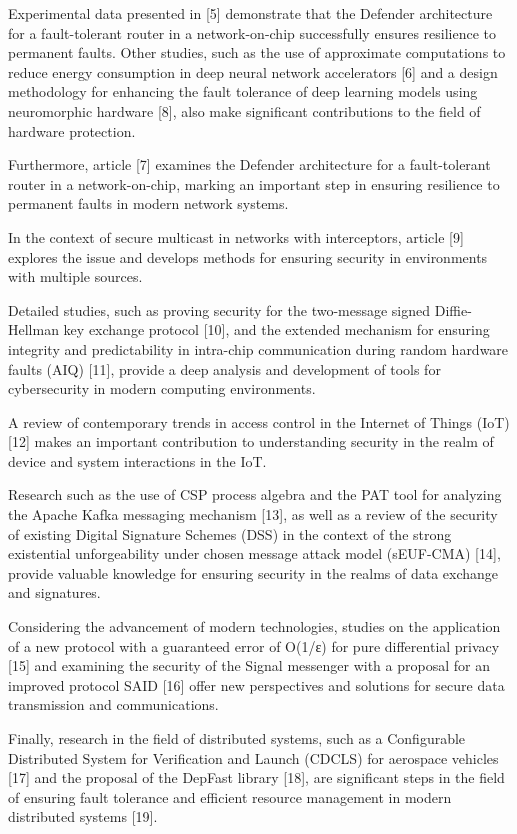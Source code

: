 \begin{multicols}{2}
Experimental data presented in {[}5{]} demonstrate that the Defender
architecture for a fault-tolerant router in a network-on-chip
successfully ensures resilience to permanent faults. Other studies, such
as the use of approximate computations to reduce energy consumption in
deep neural network accelerators {[}6{]} and a design methodology for
enhancing the fault tolerance of deep learning models using neuromorphic
hardware {[}8{]}, also make significant contributions to the field of
hardware protection.

Furthermore, article {[}7{]} examines the Defender architecture for a
fault-tolerant router in a network-on-chip, marking an important step in
ensuring resilience to permanent faults in modern network systems.

In the context of secure multicast in networks with interceptors,
article {[}9{]} explores the issue and develops methods for ensuring
security in environments with multiple sources.

Detailed studies, such as proving security for the two-message signed
Diffie-Hellman key exchange protocol {[}10{]}, and the extended
mechanism for ensuring integrity and predictability in intra-chip
communication during random hardware faults (AIQ) {[}11{]}, provide a
deep analysis and development of tools for cybersecurity in modern
computing environments.

A review of contemporary trends in access control in the Internet of
Things (IoT) {[}12{]} makes an important contribution to understanding
security in the realm of device and system interactions in the IoT.

Research such as the use of CSP process algebra and the PAT tool for
analyzing the Apache Kafka messaging mechanism {[}13{]}, as well as a
review of the security of existing Digital Signature Schemes (DSS) in
the context of the strong existential unforgeability under chosen
message attack model (sEUF-CMA) {[}14{]}, provide valuable knowledge for
ensuring security in the realms of data exchange and signatures.

Considering the advancement of modern technologies, studies on the
application of a new protocol with a guaranteed error of O(1/ε) for pure
differential privacy {[}15{]} and examining the security of the Signal
messenger with a proposal for an improved protocol SAID {[}16{]} offer
new perspectives and solutions for secure data transmission and
communications.

Finally, research in the field of distributed systems, such as a
Configurable Distributed System for Verification and Launch (CDCLS) for
aerospace vehicles {[}17{]} and the proposal of the DepFast library
{[}18{]}, are significant steps in the field of ensuring fault tolerance
and efficient resource management in modern distributed systems
{[}19{]}.


\end{multicols}
